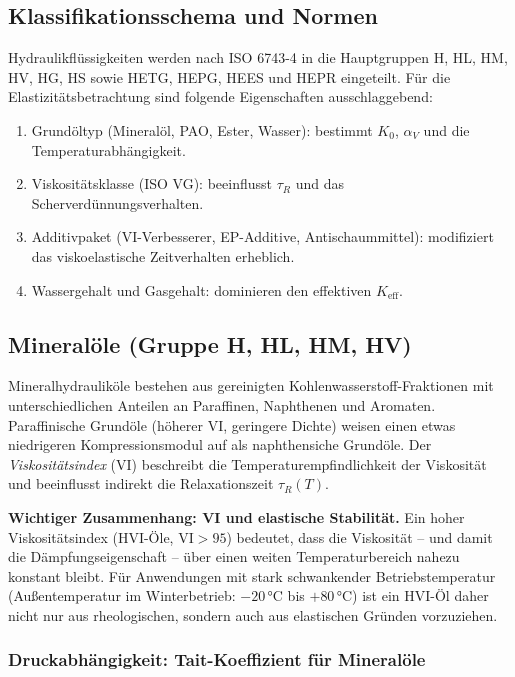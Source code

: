 ﻿\documentclass[a4paper,12pt]{scrreprt}
\theoremstyle{definition}
\begin{document}
\subsection{Klassifikationsschema und Normen}

Hydraulikflüssigkeiten werden nach ISO 6743-4 in die Hauptgruppen H, HL,
HM, HV, HG, HS sowie HETG, HEPG, HEES und HEPR eingeteilt. Für die
Elastizitätsbetrachtung sind folgende Eigenschaften ausschlaggebend:

\begin{enumerate}
  \item Grundöltyp (Mineralöl, PAO, Ester, Wasser): bestimmt $K_0$, $\alpha_V$
    und die Temperaturabhängigkeit.
  \item Viskositätsklasse (ISO VG): beeinflusst $\tau_R$ und das
    Scherverdünnungsverhalten.
  \item Additivpaket (VI-Verbesserer, EP-Additive, Antischaummittel):
    modifiziert das viskoelastische Zeitverhalten erheblich.
  \item Wassergehalt und Gasgehalt: dominieren den effektiven $K_{\mathrm{eff}}$.
\end{enumerate}

\subsection{Mineralöle (Gruppe H, HL, HM, HV)}

Mineralhydrauliköle bestehen aus gereinigten Kohlenwasserstoff-Fraktionen
mit unterschiedlichen Anteilen an Paraffinen, Naphthenen und Aromaten.
Paraffinische Grundöle (höherer VI, geringere Dichte) weisen einen etwas
niedrigeren Kompressionsmodul auf als naphthensiche Grundöle. Der
\emph{Viskositätsindex} (VI) beschreibt die Temperaturempfindlichkeit
der Viskosität und beeinflusst indirekt die Relaxationszeit $\tau_R(T)$.

\begin{infobox}
\textbf{Wichtiger Zusammenhang: VI und elastische Stabilität.}
Ein hoher Viskositätsindex (HVI-Öle, $\mathrm{VI} > 95$) bedeutet, dass
die Viskosität -- und damit die Dämpfungseigenschaft -- über einen weiten
Temperaturbereich nahezu konstant bleibt. Für Anwendungen mit stark
schwankender Betriebstemperatur (Außentemperatur im Winterbetrieb:
$-20\, °\mathrm{C}$ bis $+80\, °\mathrm{C}$) ist ein HVI-Öl daher nicht
nur aus rheologischen, sondern auch aus elastischen Gründen vorzuziehen.
\end{infobox}

\subsubsection{Druckabhängigkeit: Tait-Koeffizient für Mineralöle}
\end{document}
